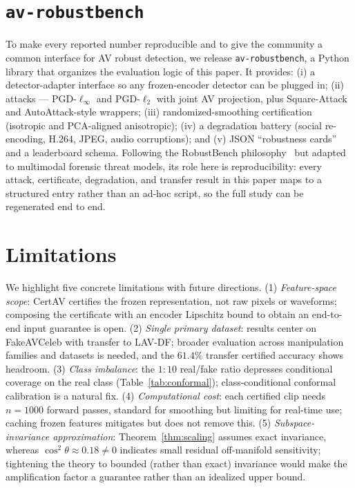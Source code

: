 \section{\texttt{av-robustbench}}
\label{sec:bench}

To make every reported number reproducible and to give the community a common interface for AV robust detection, we release \texttt{av-robustbench}, a Python library that organizes the evaluation logic of this paper. It provides: (i) a detector-adapter interface so any frozen-encoder detector can be plugged in; (ii) attacks --- PGD-$\ell_\infty$ and PGD-$\ell_2$ with joint AV projection, plus Square-Attack and AutoAttack-style wrappers; (iii) randomized-smoothing certification (isotropic and PCA-aligned anisotropic); (iv) a degradation battery (social re-encoding, H.264, JPEG, audio corruptions); and (v) JSON ``robustness cards'' and a leaderboard schema. Following the RobustBench philosophy~\cite{croce2021robustbench} but adapted to multimodal forensic threat models, its role here is reproducibility: every attack, certificate, degradation, and transfer result in this paper maps to a structured entry rather than an ad-hoc script, so the full study can be regenerated end to end.

\section{Limitations}
\label{sec:limitations}

We highlight five concrete limitations with future directions. (1) \emph{Feature-space scope}: CertAV certifies the frozen representation, not raw pixels or waveforms; composing the certificate with an encoder Lipschitz bound to obtain an end-to-end input guarantee is open. (2) \emph{Single primary dataset}: results center on FakeAVCeleb with transfer to LAV-DF; broader evaluation across manipulation families and datasets is needed, and the $61.4\%$ transfer certified accuracy shows headroom. (3) \emph{Class imbalance}: the $1{:}10$ real/fake ratio depresses conditional coverage on the real class (Table~\ref{tab:conformal}); class-conditional conformal calibration is a natural fix. (4) \emph{Computational cost}: each certified clip needs $n=1000$ forward passes, standard for smoothing but limiting for real-time use; caching frozen features mitigates but does not remove this. (5) \emph{Subspace-invariance approximation}: Theorem~\ref{thm:scaling} assumes exact invariance, whereas $\cos^2\theta\approx0.18\neq0$ indicates small residual off-manifold sensitivity; tightening the theory to bounded (rather than exact) invariance would make the amplification factor a guarantee rather than an idealized upper bound.

